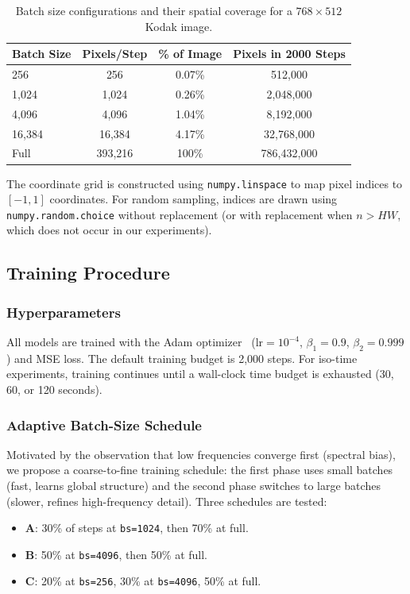 \documentclass[a4paper,oneside,11pt,english]{scrartcl}
\begin{document}
\begin{table}[H]
\centering
\caption{Batch size configurations and their spatial coverage for a
$768 \times 512$ Kodak image.}
\label{tab:batch_sizes}
\begin{tabular}{lccc}
\toprule
Batch Size & Pixels/Step & \% of Image & Pixels in 2000 Steps \\
\midrule
256      & 256      & 0.07\% & 512{,}000 \\
1{,}024  & 1{,}024  & 0.26\% & 2{,}048{,}000 \\
4{,}096  & 4{,}096  & 1.04\% & 8{,}192{,}000 \\
16{,}384 & 16{,}384 & 4.17\% & 32{,}768{,}000 \\
Full     & 393{,}216 & 100\% & 786{,}432{,}000 \\
\bottomrule
\end{tabular}
\end{table}

The coordinate grid is constructed using \texttt{numpy.linspace} to map
pixel indices to $[-1, 1]$ coordinates.  For random sampling, indices are
drawn using \texttt{numpy.random.choice} without replacement (or with
replacement when $n > HW$, which does not occur in our experiments).

\subsection{Training Procedure}

\subsubsection{Hyperparameters}

All models are trained with the Adam optimizer~\cite{kingma2015adam}
($\text{lr} = 10^{-4}$, $\beta_1 = 0.9$, $\beta_2 = 0.999$) and MSE loss.
The default training budget is 2{,}000 steps.  For iso-time experiments,
training continues until a wall-clock time budget is exhausted (30, 60, or
120 seconds).

\subsubsection{Adaptive Batch-Size Schedule}

Motivated by the observation that low frequencies converge first (spectral
bias), we propose a coarse-to-fine training schedule: the first phase uses
small batches (fast, learns global structure) and the second phase switches
to large batches (slower, refines high-frequency detail).  Three schedules
are tested:
\begin{itemize}
    \item \textbf{A}: 30\% of steps at \texttt{bs=1024}, then 70\% at full.
    \item \textbf{B}: 50\% at \texttt{bs=4096}, then 50\% at full.
    \item \textbf{C}: 20\% at \texttt{bs=256}, 30\% at \texttt{bs=4096},
          50\% at full.
\end{itemize}
\end{document}
